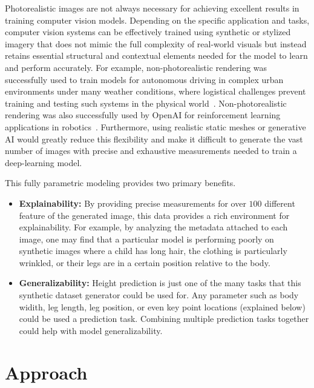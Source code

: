 \documentclass{article}
\begin{document}
Photorealistic images are not always necessary for achieving excellent results in training computer vision models. Depending on the specific application and tasks, computer vision systems can be effectively trained using synthetic or stylized imagery that does not mimic the full complexity of real-world visuals but instead retains essential structural and contextual elements needed for the model to learn and perform accurately. For example, non-photorealistic rendering was successfully used to train models for autonomous driving in complex urban environments under many weather conditions, where logistical challenges prevent training and testing such systems in the physical world~\cite{dosovitskiy2017carla}. Non-photorealistic rendering was also successfully used by OpenAI for reinforcement learning applications in robotics~\cite{openai2018dexterous}. Furthermore, using realistic static meshes or generative AI would greatly reduce this flexibility and make it difficult to generate the vast number of images with precise and exhaustive measurements needed to train a deep-learning model. 

This fully parametric modeling provides two primary benefits.

\begin{itemize}

    \item \textbf{Explainability:} By providing precise measurements for over $100$ different feature of the generated image, this data provides a rich environment for explainability. For example, by analyzing the metadata attached to each image, one may find that a particular model is performing poorly on synthetic images where a child has long hair, the clothing is particularly wrinkled, or their legs are in a certain position relative to the body.  
    
    \item \textbf{Generalizability:} Height prediction is just one of the many tasks that this synthetic dataset generator could be used for. Any parameter such as body widith, leg length, leg position, or even key point locations (explained below) could be used a prediction task. Combining multiple prediction tasks together could help with model generalizability.

\end{itemize}

\section{Approach}
\end{document}
